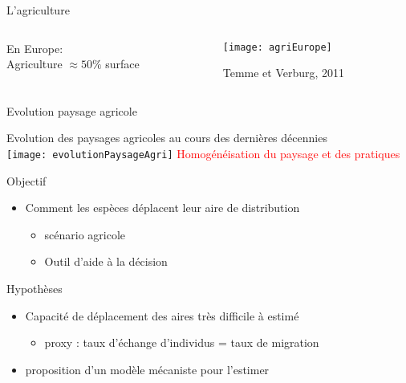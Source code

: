 \documentclass[]{beamer}
\begin{document}
\begin{frame}{L'agriculture}
  \begin{columns}[c]
    \begin{column}[c]{0.4\textwidth}
      \begin{center}
        En Europe: \\ Agriculture $\approx 50\%$  surface 
      \end{center}
    \end{column}
    \begin{column}[c]{0.6\textwidth}
      \begin{center}
        \texttt{[image: agriEurope]}
      \end{center}
      \begin{tiny}
        Temme et Verburg, 2011
      \end{tiny}
    \end{column}
  \end{columns}
\end{frame}

\begin{frame}{Evolution paysage agricole}
  \begin{center}
    Evolution des paysages agricoles au cours des dernières décennies \\
    \vspace{10pt}
    \texttt{[image: evolutionPaysageAgri]}
    \vspace{10pt}
    \textcolor{red}{Homogénéisation du paysage et des pratiques}
  \end{center}
\end{frame}





\begin{frame}{Objectif}
  \begin{itemize}[<+->]
  \item Comment les espèces déplacent leur aire de distribution
    \begin{itemize}
    \item scénario agricole
    \item Outil d'aide à la décision
    \end{itemize}
  \end{itemize}
\end{frame}

\begin{frame}{Hypothèses}
  \begin{itemize}[<+->]
  \item Capacité de déplacement des aires très difficile à estimé
    \begin{itemize}
    \item proxy : taux d'échange d'individus = taux de migration    
    \end{itemize}
  \item proposition d'un modèle mécaniste pour l'estimer
  \end{itemize}
\end{frame}
\end{document}

